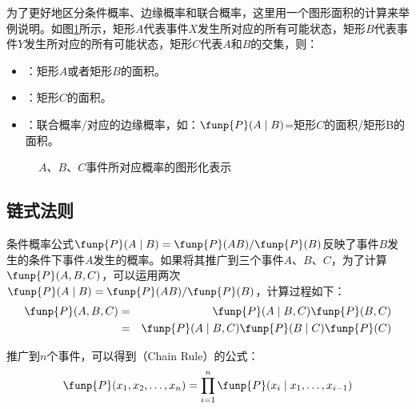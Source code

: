 \parinterval 为了更好地区分条件概率、边缘概率和联合概率，这里用一个图形面积的计算来举例说明。如图\ref{fig:2-2}所示，矩形$A$代表事件$X$发生所对应的所有可能状态，矩形$B$代表事件$Y$发生所对应的所有可能状态，矩形$C$代表$A$和$B$的交集，则：

\begin{itemize}
\vspace{0.5em}
\item {\small{}}：矩形$A$或者矩形$B$的面积。
\vspace{0.5em}
\item {\small{}}：矩形$C$的面积。
\vspace{0.5em}
\item {\small{}}：联合概率/对应的边缘概率，如：$\funp{P}(A \mid B)$=矩形$C$的面积/矩形B的面积。
\vspace{0.5em}
\end{itemize}

\begin{figure}[htp]
\centering

\caption{$A$、$B$、$C$事件所对应概率的图形化表示}
\label{fig:2-2}
\end{figure}


\subsection{链式法则} \label{sec:chain-rule}

\parinterval 条件概率公式$\funp{P}(A \mid B)=\funp{P}(AB)/\funp{P}(B)$反映了事件$B$发生的条件下事件$A$发生的概率。如果将其推广到三个事件$A$、$B$、$C$，为了计算$\funp{P}(A,B,C)$，可以运用两次$\funp{P}(A \mid B)=\funp{P}(AB)/\funp{P}(B)$，计算过程如下：
\begin{eqnarray}
\funp{P}(A,B,C) & = & \funp{P}(A \mid B ,C)\funp{P}(B,C) \nonumber \\
                           & = & \funp{P}(A \mid B,C)\funp{P}(B \mid C)\funp{P}(C)
\label{eq:2-5}
\end{eqnarray}

\parinterval 推广到$n$个事件，可以得到{\small{}}（Chain Rule）的公式：
\begin{eqnarray}
\funp{P}(x_1,x_2, \ldots ,x_n)=\prod_{i=1}^n \funp{P}(x_i \mid x_1, \ldots ,x_{i-1})
\label{eq:2-6}
\end{eqnarray}

